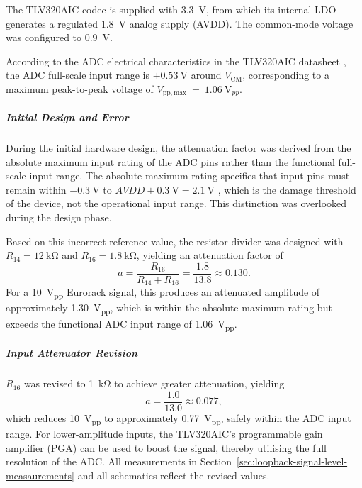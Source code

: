 The TLV320AIC codec is supplied with \SI{3.3}{\volt}, from which its internal LDO generates a regulated \SI{1.8}{\volt} analog supply (AVDD). 
The common-mode voltage was configured to \SI{0.9}{\volt}.

According to the ADC electrical characteristics in the TLV320AIC datasheet \cite[p.~9]{texasinstrumentsTlv320aic3204Datasheet}, the ADC full-scale input range is \(\pm \SI{0.53}{\volt}\) around \(V_\mathrm{CM}\), corresponding to a maximum peak-to-peak voltage of
$ V_\mathrm{pp,max}~=~\SI{1.06}{\volt_{pp}}$. 

\subparagraph{Initial Design and Error}

During the initial hardware design, the attenuation factor was derived from the absolute maximum input rating of the ADC pins rather than the functional full-scale input range.
The absolute maximum rating specifies that input pins must remain within \(\qty{-0.3}{\volt}\) to \(AVDD + \qty{0.3}{\volt} = \SI{2.1}{\volt}\) \cite[p.~9]{texasinstrumentsTlv320aic3204Datasheet}, which is the damage threshold of the device, not the operational input range.
This distinction was overlooked during the design phase.

Based on this incorrect reference value, the resistor divider was designed with \(R_{14} = \qty{12}{\kilo\ohm}\) and \(R_{16} = \qty{1.8}{\kilo\ohm}\), yielding an attenuation factor of
\begin{equation}
a = \frac{R_{16}}{R_{14} + R_{16}} = \frac{1.8}{13.8} \approx 0.130.
\end{equation}
For a \SI{10}{\volt_{pp}} Eurorack signal, this produces an attenuated amplitude of approximately \SI{1.30}{\volt_{pp}}, which is within the absolute maximum rating but exceeds the functional ADC input range of \SI{1.06}{\volt_{pp}}.

\subparagraph{Input Attenuator Revision}
\label{sec:input-attenuator-changes}

\(R_{16}\) was revised to \qty{1}{\kilo\ohm} to achieve greater attenuation, yielding
\begin{equation}
a = \frac{1.0}{13.0} \approx 0.077,
\end{equation}
which reduces \SI{10}{\volt_{pp}} to approximately \SI{0.77}{\volt_{pp}}, safely within the ADC input range.
For lower-amplitude inputs, the TLV320AIC's programmable gain amplifier (PGA) can be used to boost the signal, thereby utilising the full resolution of the ADC.
All measurements in Section~\ref{sec:loopback-signal-level-measaurements} and all schematics reflect the revised values.

